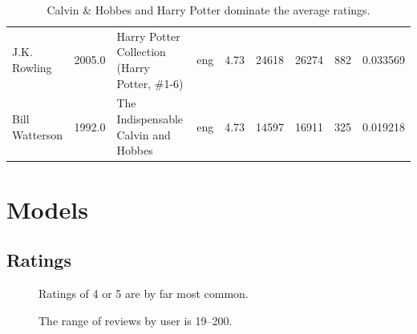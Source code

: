 \documentclass[handout]{beamer}
\begin{document}
\begin{frame}
\begin{table}
\begin{tabular}{lHlHHHHHZ}
                               J.K. Rowling &                     2005.0 &       Harry Potter Collection (Harry Potter, \#1-6) &           eng &            4.73 &          24618 &               26274 &                      882 &       0.033569 \\
                             Bill Watterson &                     1992.0 &                The Indispensable Calvin and Hobbes &           eng &            4.73 &          14597 &               16911 &                      325 &       0.019218 \\
\bottomrule
\end{tabular}
    \caption[Most Highly-Rated Books]{Calvin \& Hobbes and Harry Potter dominate the average ratings.}
     \label{tbl:most-rated-books}
\end{table}


\end{frame}




\section{Models}


\subsection{Ratings}


\begin{frame}

\begin{figure}
    \begin{center}
    \end{center}
    \caption[Distribution of User Ratings]{Ratings of 4 or 5 are by far most common.}
     \label{fig:average-rating-reviews-count}
\end{figure}
\end{frame}

\begin{frame}
\begin{figure}

    \begin{center}
    \end{center}
    \caption[Distribution of Ratings by User]{The range of reviews by user is 19--200.}
     \label{fig:ratings-by-user}
     \end{figure}

\end{frame}
\end{document}

